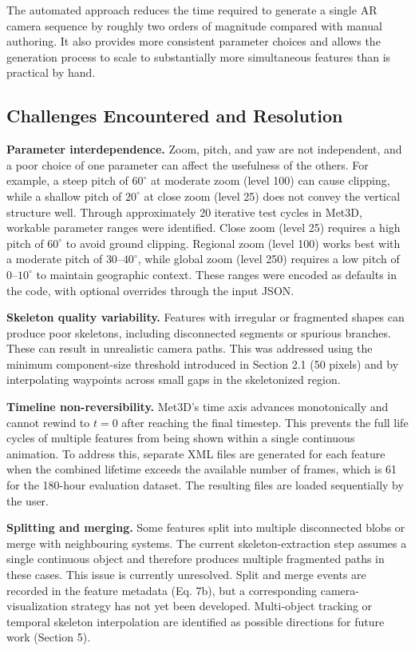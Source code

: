 \documentclass[journal abbreviation, manuscript]{copernicus}
\begin{document}
The automated approach reduces the time required to generate a single AR camera sequence by roughly two orders of magnitude compared with manual authoring. It also provides more consistent parameter choices and allows the generation process to scale to substantially more simultaneous features than is practical by hand.

\subsection{Challenges Encountered and Resolution}

\textbf{Parameter interdependence.}
Zoom, pitch, and yaw are not independent, and a poor choice of one parameter can affect the usefulness of the others. For example, a steep pitch of $60^{\circ}$ at moderate zoom (level 100) can cause clipping, while a shallow pitch of $20^{\circ}$ at close zoom (level 25) does not convey the vertical structure well. Through approximately 20 iterative test cycles in Met3D, workable parameter ranges were identified. Close zoom (level 25) requires a high pitch of $60^{\circ}$ to avoid ground clipping. Regional zoom (level 100) works best with a moderate pitch of $30$--$40^{\circ}$, while global zoom (level 250) requires a low pitch of $0$--$10^{\circ}$ to maintain geographic context. These ranges were encoded as defaults in the code, with optional overrides through the input JSON.

\textbf{Skeleton quality variability.}
Features with irregular or fragmented shapes can produce poor skeletons, including disconnected segments or spurious branches. These can result in unrealistic camera paths. This was addressed using the minimum component-size threshold introduced in Section 2.1 (50 pixels) and by interpolating waypoints across small gaps in the skeletonized region.

\textbf{Timeline non-reversibility.}
Met3D's time axis advances monotonically and cannot rewind to $t=0$ after reaching the final timestep. This prevents the full life cycles of multiple features from being shown within a single continuous animation. To address this, separate XML files are generated for each feature when the combined lifetime exceeds the available number of frames, which is 61 for the 180-hour evaluation dataset. The resulting files are loaded sequentially by the user.

\textbf{Splitting and merging.}
Some features split into multiple disconnected blobs or merge with neighbouring systems. The current skeleton-extraction step assumes a single continuous object and therefore produces multiple fragmented paths in these cases. This issue is currently unresolved. Split and merge events are recorded in the feature metadata (Eq. 7b), but a corresponding camera-visualization strategy has not yet been developed. Multi-object tracking or temporal skeleton interpolation are identified as possible directions for future work (Section 5).
\end{document}
